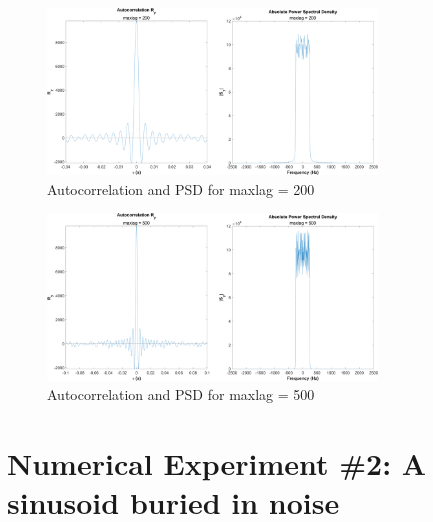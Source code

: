 \documentclass[12pt]{article}
\begin{document}
\begin{enumerate}[label=\roman*)]
	\begin{figure}[h]
		\centering
		\includegraphics[width=0.78\textwidth]{exp1_maxlag_200}
		\caption{\label{fig:exp1_maxlag200}Autocorrelation and PSD for maxlag = 200}
	\end{figure}
	
	\begin{figure}[h]
		\centering
		\includegraphics[width=0.78\textwidth]{exp1_maxlag_500}
		\caption{\label{fig:exp1_maxlag500}Autocorrelation and PSD for maxlag = 500}
	\end{figure}

\end{enumerate} \clearpage

\section*{Numerical Experiment \#2: A sinusoid buried in noise}
\end{document}

